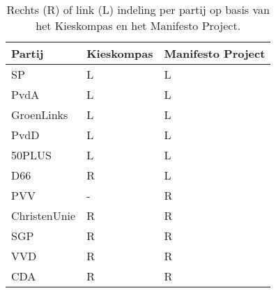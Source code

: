 \begin{table}[H]
\centering
\caption{Rechts (R) of link (L) indeling per partij op basis van het Kieskompas en het Manifesto Project.}
\label{my-label}
\centering
\begin{tabular}{lll}
\hline
Partij  & Kieskompas & Manifesto Project \\ \hline
SP           & L & L\\ 
PvdA         & L & L\\ 
GroenLinks   & L & L\\ 
PvdD         & L & L\\ 
50PLUS       & L & L\\ 
D66          & R & L\\ 
PVV          & - & R\\ 
ChristenUnie & R & R\\ 
SGP          & R & R\\ 
VVD          & R & R\\ 
CDA          & R & R\\
\end{tabular}
\end{table}


